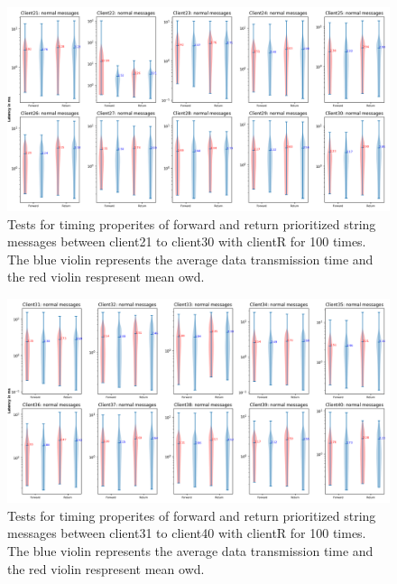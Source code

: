 \begin{figure}
    \includegraphics[width=\textheight]{figures/appendix/priority_tests/log_violin_50clients_string_figure_3.png}\hfill 
    \caption{Tests for timing properites of forward and return prioritized string messages between client21 to client30 
    with clientR for 100 times. The blue violin represents the average data transmission time and the red violin 
    respresent mean \gls{owd}.} \label{fig: priority-50clients-string-c}
\end{figure}

\begin{figure}
    \includegraphics[width=\textheight]{figures/appendix/priority_tests/log_violin_50clients_string_figure_4.png}\hfill 
    \caption{Tests for timing properites of forward and return prioritized string messages between client31 to client40 
    with clientR for 100 times. The blue violin represents the average data transmission time and the red violin 
    respresent mean \gls{owd}.} \label{fig: priority-50clients-string-d}
\end{figure}

